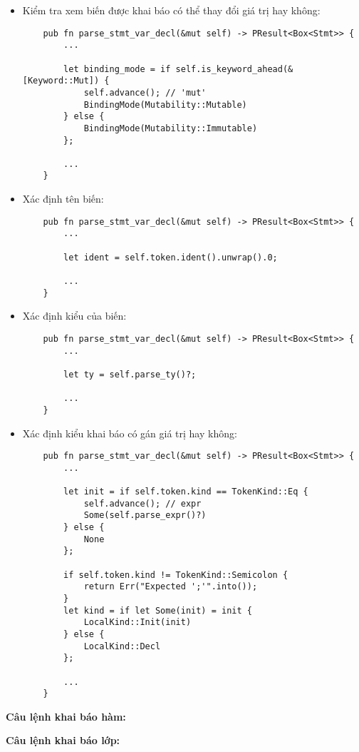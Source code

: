 \begin{itemize}
    \item Kiểm tra xem biến được khai báo có thể thay đổi giá trị hay không:
\begin{lstlisting}
    pub fn parse_stmt_var_decl(&mut self) -> PResult<Box<Stmt>> {
        ...

        let binding_mode = if self.is_keyword_ahead(&[Keyword::Mut]) {
            self.advance(); // 'mut'
            BindingMode(Mutability::Mutable)
        } else {
            BindingMode(Mutability::Immutable)
        };

        ...
    }
\end{lstlisting}
    \item Xác định tên biến:
\begin{lstlisting}
    pub fn parse_stmt_var_decl(&mut self) -> PResult<Box<Stmt>> {
        ...

        let ident = self.token.ident().unwrap().0;

        ...
    }
\end{lstlisting}
    \item Xác định kiểu của biến:
\begin{lstlisting}
    pub fn parse_stmt_var_decl(&mut self) -> PResult<Box<Stmt>> {
        ...

        let ty = self.parse_ty()?;

        ...
    }
\end{lstlisting}
    \item Xác định kiểu khai báo có gán giá trị hay không:
\begin{lstlisting}
    pub fn parse_stmt_var_decl(&mut self) -> PResult<Box<Stmt>> {
        ...

        let init = if self.token.kind == TokenKind::Eq {
            self.advance(); // expr
            Some(self.parse_expr()?)
        } else {
            None
        };

        if self.token.kind != TokenKind::Semicolon {
            return Err("Expected ';'".into());
        }
        let kind = if let Some(init) = init {
            LocalKind::Init(init)
        } else {
            LocalKind::Decl
        };

        ...
    }
\end{lstlisting}
\end{itemize}



\textbf{Câu lệnh khai báo hàm:}

\textbf{Câu lệnh khai báo lớp:}

